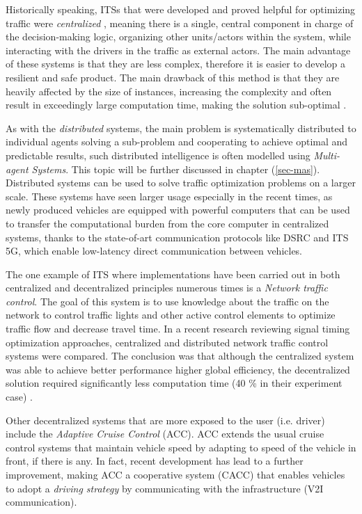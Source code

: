 \documentclass[main.tex]{subfiles}
\begin{document}
Historically speaking, ITSs that were
developed and proved helpful for optimizing traffic were \emph{centralized} \cite{Corman2010}, meaning there is a
single, central component in charge of the decision-making logic, organizing other units/actors within the
system, while interacting with the drivers in the traffic as external actors. The main
advantage of these systems is that they are less complex, therefore it is easier to develop a resilient and
safe product. The main drawback of this method is that they are heavily affected by the size
of instances, increasing the complexity and often result in exceedingly large computation time,
making the solution sub-optimal \cite{Corman2010}. 

As with the \emph{distributed} systems, the main problem is systematically distributed to
individual agents solving a sub-problem and cooperating to achieve optimal and predictable
results, such distributed intelligence is often modelled using \emph{Multi-agent Systems}. 
This topic will be further discussed in chapter (\ref{sec-mas}). Distributed systems can be used to
solve traffic optimization problems on a larger scale. These systems have seen larger usage
especially in the recent times, as newly produced vehicles are equipped with powerful computers
that can be used to transfer the computational burden from the core computer in centralized
systems, thanks to the state-of-art communication protocols like DSRC and ITS 5G, which enable
low-latency direct communication between vehicles. 

The one example of ITS where implementations have been carried out in both centralized and 
decentralized principles numerous times is a \emph{Network traffic control}. The goal of this 
system is to use knowledge about the traffic on the network to control traffic lights and other 
active control elements to optimize traffic flow and decrease travel time. In a recent research 
reviewing signal timing optimization approaches, centralized and distributed network traffic
control systems were compared. The conclusion was that although the centralized system was able
to achieve better performance higher global efficiency, the decentralized solution required
significantly less computation time (40 \% in their experiment case) \cite{Chow2019}.

Other decentralized systems that are more exposed to the user (i.e. driver) include the 
\emph{Adaptive Cruise Control} (ACC). ACC extends the usual cruise control systems 
that maintain vehicle speed by adapting to speed of the vehicle in front, if there is any. In fact, 
recent development has lead to a further improvement, making ACC a cooperative system (CACC) that 
enables vehicles to adopt a \emph{driving strategy} by communicating with the infrastructure (V2I 
communication).
\end{document}
